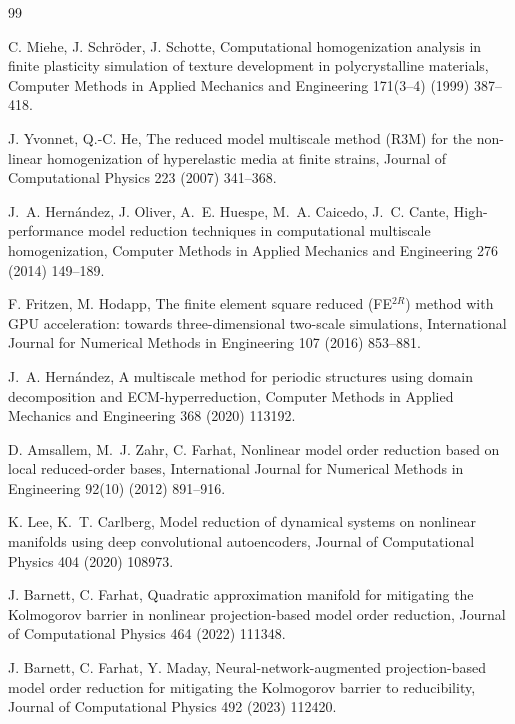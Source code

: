 \begin{thebibliography}{99}

C. Miehe, J. Schr\"oder, J. Schotte, Computational homogenization
analysis in finite plasticity simulation of texture development in
polycrystalline materials, Computer Methods in Applied Mechanics
and Engineering 171(3--4) (1999) 387--418.

J. Yvonnet, Q.-C. He, The reduced model multiscale method (R3M) for the non-linear homogenization of hyperelastic media at finite strains, Journal of Computational Physics 223 (2007) 341--368. 

J.~A. Hern\'andez, J. Oliver, A.~E. Huespe, M.~A. Caicedo, J.~C.
Cante, High-performance model reduction techniques in computational
multiscale homogenization, Computer Methods in Applied Mechanics
and Engineering 276 (2014) 149--189.

F. Fritzen, M. Hodapp, The finite element square reduced (FE$^{2R}$) method with GPU acceleration: towards three-dimensional two-scale simulations,
International Journal for Numerical Methods in Engineering 107 (2016) 853--881.

J.~A. Hern\'andez, A multiscale method for periodic structures using
domain decomposition and ECM-hyperreduction, Computer Methods in
Applied Mechanics and Engineering 368 (2020) 113192.

D. Amsallem, M.~J. Zahr, C. Farhat, Nonlinear model order
reduction based on local reduced-order bases, International
Journal for Numerical Methods in Engineering 92(10) (2012) 891--916.

K. Lee, K.~T. Carlberg, Model reduction of dynamical systems on
nonlinear manifolds using deep convolutional autoencoders,
Journal of Computational Physics 404 (2020) 108973.

J. Barnett, C. Farhat, Quadratic approximation manifold for
mitigating the Kolmogorov barrier in nonlinear projection-based model
order reduction, Journal of Computational Physics 464 (2022) 111348.

J. Barnett, C. Farhat, Y. Maday, Neural-network-augmented projection-based model order reduction for mitigating the Kolmogorov barrier to reducibility, Journal of Computational Physics 492 (2023) 112420.


\end{thebibliography}
